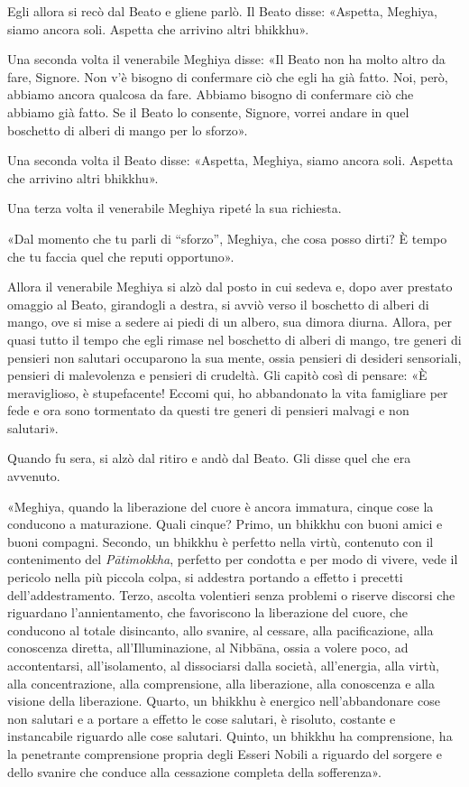 Egli allora si recò dal Beato e gliene parlò. Il Beato disse: «Aspetta, Meghiya,
siamo ancora soli. Aspetta che arrivino altri bhikkhu».

Una seconda volta il venerabile Meghiya disse: «Il Beato non ha molto altro da
fare, Signore. Non v’è bisogno di confermare ciò che egli ha già fatto. Noi,
però, abbiamo ancora qualcosa da fare. Abbiamo bisogno di confermare ciò che
abbiamo già fatto. Se il Beato lo consente, Signore, vorrei andare in quel
boschetto di alberi di mango per lo sforzo».

Una seconda volta il Beato disse: «Aspetta, Meghiya, siamo ancora soli. Aspetta
che arrivino altri bhikkhu».

Una terza volta il venerabile Meghiya ripeté la sua richiesta.

«Dal momento che tu parli di “sforzo”, Meghiya, che cosa posso dirti? È tempo
che tu faccia quel che reputi opportuno».

Allora il venerabile Meghiya si alzò dal posto in cui sedeva e, dopo aver
prestato omaggio al Beato, girandogli a destra, si avviò verso il boschetto di
alberi di mango, ove si mise a sedere ai piedi di un albero, sua dimora diurna.
Allora, per quasi tutto il tempo che egli rimase nel boschetto di alberi di
mango, tre generi di pensieri non salutari occuparono la sua mente, ossia
pensieri di desideri sensoriali, pensieri di malevolenza e pensieri di crudeltà.
Gli capitò così di pensare: «È meraviglioso, è stupefacente! Eccomi qui, ho
abbandonato la vita famigliare per fede e ora sono tormentato da questi tre
generi di pensieri malvagi e non salutari».

Quando fu sera, si alzò dal ritiro e andò dal Beato. Gli disse quel che era
avvenuto.

«Meghiya, quando la liberazione del cuore è ancora immatura, cinque cose la
conducono a maturazione. Quali cinque? Primo, un bhikkhu con buoni amici e buoni
compagni. Secondo, un bhikkhu è perfetto nella virtù, contenuto con il
contenimento del \emph{Pātimokkha}, perfetto per condotta e per modo di vivere,
vede il pericolo nella più piccola colpa, si addestra portando a effetto i
precetti dell’addestramento. Terzo, ascolta volentieri senza problemi o riserve
discorsi che riguardano l’annientamento, che favoriscono la liberazione del
cuore, che conducono al totale disincanto, allo svanire, al cessare, alla
pacificazione, alla conoscenza diretta, all’Illuminazione, al Nibbāna, ossia a
volere poco, ad accontentarsi, all’isolamento, al dissociarsi dalla società,
all’energia, alla virtù, alla concentrazione, alla comprensione, alla
liberazione, alla conoscenza e alla visione della liberazione. Quarto, un
bhikkhu è energico nell’abbandonare cose non salutari e a portare a effetto le
cose salutari, è risoluto, costante e instancabile riguardo alle cose salutari.
Quinto, un bhikkhu ha comprensione, ha la penetrante comprensione propria degli
Esseri Nobili a riguardo del sorgere e dello svanire che conduce alla cessazione
completa della sofferenza».

